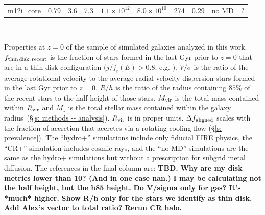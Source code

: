 \documentclass[fleqn,usenatbib]{mnras}
\begin{document}
\begin{table}
\begin{tabular}{cccccccccc}
m12i\_core  &  0.79  &  3.6  &  7.3  &  $1.1\times10^{12}$  &  $8.0\times10^{10}$  &  274  &  0.29  &  no MD  &  ?    \\
\end{tabular}
\\
\begin{flushleft}
Properties at $z=0$ of the sample of simulated galaxies analyzed in this work.
$f_{\rm thin\,disk,\,recent}$ is the fraction of stars formed in the last Gyr prior to $z=0$ that are in a thin disk configuration ($j/j_c(E) > 0.8$; e.g. \citealt{Yu2021}).
$V/\sigma$ is the ratio of the average rotational velocity to the average radial velocity dispersion stars formed in the last Gyr prior to $z=0$.
$R/h$ is the ratio of the radius containing $85\%$ of the recent stars to the half height of those stars.
$M_{\rm vir}$ is the total mass contained within $R_{\rm vir}$ and $M_\star$ is the total stellar mass contained within the galaxy radius~(\S\ref{s: methods -- analysis}). 
$R_{\rm vir}$ is in proper units.
$\Delta f_{\rm aligned}$ scales with the fraction of accretion that accretes via a rotating cooling flow (\S\ref{s: prevalence}).
The ``hydro+'' simulations include only fiducial FIRE physics, the ``CR+'' simulation includes cosmic rays, and the ``no MD'' simulations are the same as the hydro+ simulations but without a prescription for subgrid metal diffusion.
The references in the final column are:
\textbf{TBD.}
\textbf{Why are my disk metrics lower than 10? (And in one case nan.)}
\textbf{I may be calculating not the half height, but the h85 height.}
\textbf{Do V/sigma only for gas? It's *much* higher.}
\textbf{Show R/h only for the stars we identify as thin disk.}
\textbf{Add Alex's vector to total ratio?}
\textbf{Rerun CR halo.}
\end{flushleft}
\label{table: simulations_used}
\end{table}

\end{document}
